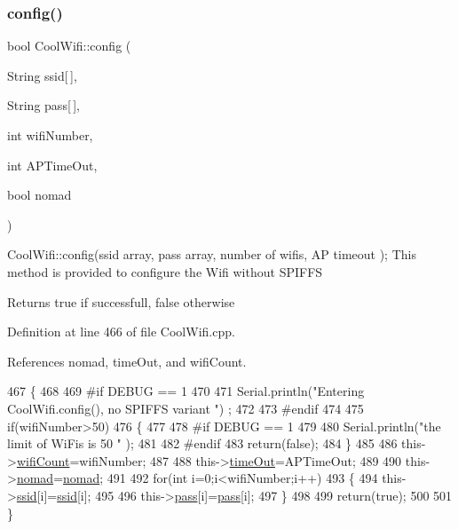 \subsubsection{\texorpdfstring{config()}{config()}\hspace{0.1cm}{\footnotesize\ttfamily [2/2]}}
{\footnotesize\ttfamily bool Cool\+Wifi\+::config (\begin{DoxyParamCaption}\item[{String}]{ssid\mbox{[}$\,$\mbox{]},  }\item[{String}]{pass\mbox{[}$\,$\mbox{]},  }\item[{int}]{wifi\+Number,  }\item[{int}]{A\+P\+Time\+Out,  }\item[{bool}]{nomad }\end{DoxyParamCaption})}

Cool\+Wifi\+::config(ssid array, pass array, number of wifis, A\+P timeout ); This method is provided to configure the Wifi without S\+P\+I\+F\+FS

\begin{DoxyReturn}{Returns}
true if successfull, false otherwise 
\end{DoxyReturn}


Definition at line 466 of file Cool\+Wifi.\+cpp.



References nomad, time\+Out, and wifi\+Count.


\begin{DoxyCode}
467 \{
468 
469 \textcolor{preprocessor}{#if DEBUG == 1 }
470     
471     Serial.println(\textcolor{stringliteral}{"Entering CoolWifi.config(), no SPIFFS variant "}) ;
472     
473 \textcolor{preprocessor}{#endif}
474     
475     \textcolor{keywordflow}{if}(wifiNumber>50)
476     \{
477     
478 \textcolor{preprocessor}{    #if DEBUG == 1 }
479         
480         Serial.println(\textcolor{stringliteral}{"the limit of WiFis is 50 "} );
481         
482 \textcolor{preprocessor}{    #endif}
483         \textcolor{keywordflow}{return}(\textcolor{keyword}{false});  
484     \}
485 
486     this->\hyperlink{classCoolWifi_ab133bd92fcb895b884deecd6678592e4}{wifiCount}=wifiNumber;
487 
488     this->\hyperlink{classCoolWifi_a952111605f25156588b5632caaba1c6f}{timeOut}=APTimeOut;
489 
490     this->\hyperlink{classCoolWifi_ab7d9643c4af7bac3be331ef008b2ea27}{nomad}=\hyperlink{classCoolWifi_ab7d9643c4af7bac3be331ef008b2ea27}{nomad};
491     
492     \textcolor{keywordflow}{for}(\textcolor{keywordtype}{int} i=0;i<wifiNumber;i++)
493     \{
494         this->\hyperlink{classCoolWifi_a893b21d0fed821438733bba2e73fb4c2}{ssid}[i]=\hyperlink{classCoolWifi_a893b21d0fed821438733bba2e73fb4c2}{ssid}[i];
495         
496         this->\hyperlink{classCoolWifi_a0c3332a149245aaad060b32593a54c9b}{pass}[i]=\hyperlink{classCoolWifi_a0c3332a149245aaad060b32593a54c9b}{pass}[i];
497     \}
498         
499     \textcolor{keywordflow}{return}(\textcolor{keyword}{true});
500 
501 \}
\end{DoxyCode}
\mbox{\label{classCoolWifi_ad060353050f40d032a2dbf9e54a768bf}} 
